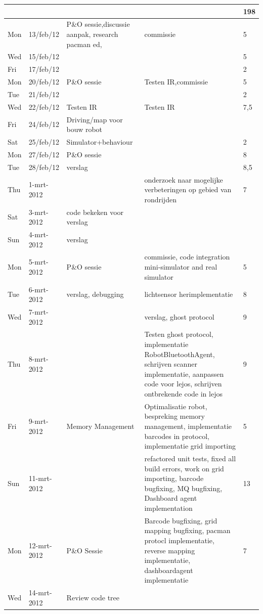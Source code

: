 \documentclass[12pt,a4paper]{report}
\begin{document}
\begin{landscape}
\begin{longtable}{llp{7cm}p{10cm}l}
\hline
 &  &  &  & 198 \\ 
\hline
Mon & 13/feb/12 & P\&O sessie,discussie aanpak, research pacman ed,  & commissie & 5 \\ 
\hline
Wed & 15/feb/12 &  &  & 5 \\ 
\hline
Fri & 17/feb/12 &  &  & 2 \\ 
\hline
Mon & 20/feb/12 & P\&O  sessie & Testen IR,commissie & 5 \\ 
\hline
Tue & 21/feb/12 &  &  & 2 \\ 
\hline
Wed & 22/feb/12 & Testen IR & Testen IR & 7,5 \\ 
\hline
Fri & 24/feb/12 & Driving/map voor bouw robot &  &  \\ 
\hline
Sat & 25/feb/12 & Simulator+behaviour &  & 2 \\ 
\hline
Mon & 27/feb/12 & P\&O sessie &  & 8 \\ 
\hline
Tue & 28/feb/12 & verslag &  & 8,5 \\ 
\hline
Thu & 1-mrt-2012 &  & onderzoek naar mogelijke verbeteringen op gebied van rondrijden & 7 \\ 
\hline
Sat & 3-mrt-2012 & code bekeken voor verslag &  &  \\ 
\hline
Sun & 4-mrt-2012 & verslag &  &  \\ 
\hline
Mon & 5-mrt-2012 & P\&O sessie & commissie, code integration mini-simulator and real simulator & 5 \\ 
\hline
Tue & 6-mrt-2012 & verslag, debugging & lichtsensor herimplementatie & 8 \\ 
\hline
Wed & 7-mrt-2012 &  & verslag, ghost protocol & 9 \\ 
\hline
Thu & 8-mrt-2012 &  & Testen ghost protocol, implementatie RobotBluetoothAgent, schrijven scanner implementatie, aanpassen code voor lejos, schrijven ontbrekende code in lejos & 9 \\ 
\hline
Fri & 9-mrt-2012 & Memory Management & Optimalisatie robot, bespreking memory management, implementatie barcodes in protocol, implementatie grid importing & 5 \\ 
\hline
Sun & 11-mrt-2012 &  & refactored unit tests, fixed all build errors, work on grid importing, barcode bugfixing, MQ bugfixing, Dashboard agent implementation & 13 \\ 
\hline
Mon & 12-mrt-2012 & P\&O Sessie & Barcode bugfixing, grid mapping bugfixing, pacman protocl implementatie, reverse mapping implementatie, dashboardagent implementatie & 7 \\ 
\hline
Wed & 14-mrt-2012 & Review code tree  &  &  \\ 

\end{longtable}
\end{landscape}
\end{document}
